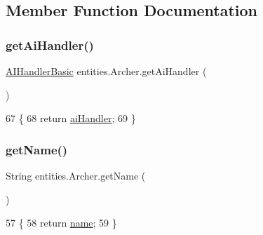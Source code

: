 \subsection{Member Function Documentation}
\mbox{\label{classentities_1_1_archer_ae85ccf8025d689f81fa292006792349a}} 
\subsubsection{\texorpdfstring{get\+Ai\+Handler()}{getAiHandler()}}
{\footnotesize\ttfamily \mbox{\hyperlink{classentities_1_1_a_i_handler_basic}{A\+I\+Handler\+Basic}} entities.\+Archer.\+get\+Ai\+Handler (\begin{DoxyParamCaption}{ }\end{DoxyParamCaption})\hspace{0.3cm}{\ttfamily [inline]}}


\begin{DoxyCode}
67                                          \{
68         \textcolor{keywordflow}{return} \mbox{\hyperlink{classentities_1_1_archer_a362254fb1ca99f07804647033ffe26d1}{aiHandler}};
69     \}
\end{DoxyCode}
\mbox{\label{classentities_1_1_archer_ad4d119c0a91628b0c5a1b4bdcf416ebb}} 
\subsubsection{\texorpdfstring{get\+Name()}{getName()}}
{\footnotesize\ttfamily String entities.\+Archer.\+get\+Name (\begin{DoxyParamCaption}{ }\end{DoxyParamCaption})\hspace{0.3cm}{\ttfamily [inline]}}


\begin{DoxyCode}
57                             \{
58         \textcolor{keywordflow}{return} \mbox{\hyperlink{classentities_1_1_archer_a2c5680a0d628e5abbf69711d7df4d0b6}{name}};
59     \}
\end{DoxyCode}
\mbox{\label{classentities_1_1_archer_a65b384bc5292d266d21dde02efe77a77}} 
